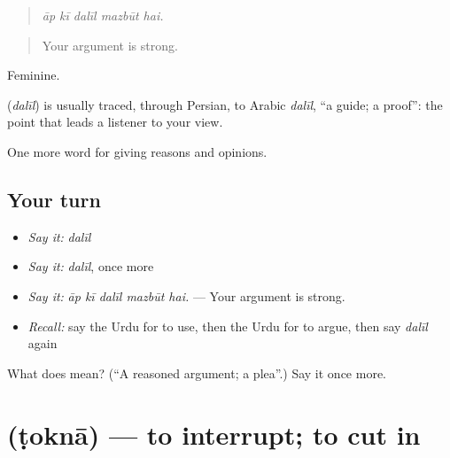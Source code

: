 \begin{quote}
    
\end{quote}

\begin{quote}
\emph{āp kī dalīl mazbūt hai.}
\end{quote}

\begin{quote}
Your argument is strong.
\end{quote}

Feminine.

\begin{cousinweb}
\textbf{} (\emph{dalīl}) is usually traced, through Persian, to Arabic \emph{dalīl}, \textquotedblleft{}a guide; a proof\textquotedblright{}: the point that leads a listener to your view.
\end{cousinweb}

\begin{grammarlens}[title={What you've built}]
One more word for giving reasons and opinions.
\end{grammarlens}

\subsection*{Your turn}
\begin{itemize}
\raggedright
  \item \emph{Say it:} \emph{dalīl}
  \item \emph{Say it:} \emph{dalīl}, once more
  \item \emph{Say it:} \emph{āp kī dalīl mazbūt hai.} — Your argument is strong.
  \item \emph{Recall:} say the Urdu for to use, then the Urdu for to argue, then say \emph{dalīl} again
\end{itemize}

\begin{tcolorbox}[breakable,colback=teal!4,colframe=teal!35!black,title={Before you move on}]
What does  mean? (\textquotedblleft{}A reasoned argument; a plea\textquotedblright{}.) Say it once more.
\end{tcolorbox}
\section[\texorpdfstring{\ur{ٹوکنا} (ṭoknā)}{ٹوکنا (ṭoknā)}]{ (ṭoknā) — to interrupt; to cut in}

\label{lesson:UR-C334-tokna}



